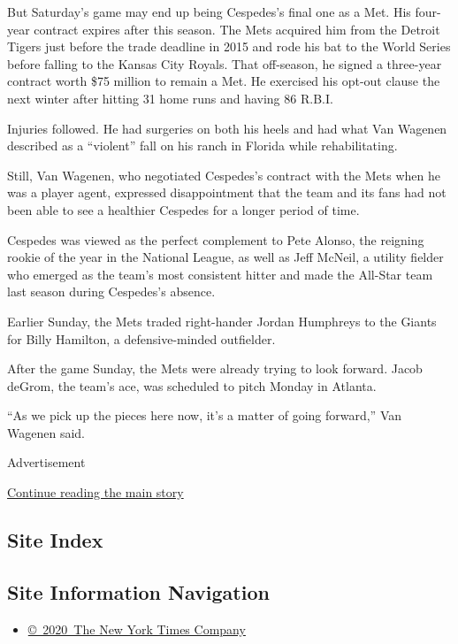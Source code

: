 But Saturday's game may end up being Cespedes's final one as a Met. His
four-year contract expires after this season. The Mets acquired him from
the Detroit Tigers just before the trade deadline in 2015 and rode his
bat to the World Series before falling to the Kansas City Royals. That
off-season, he signed a three-year contract worth \$75 million to remain
a Met. He exercised his opt-out clause the next winter after hitting 31
home runs and having 86 R.B.I.

Injuries followed. He had surgeries on both his heels and had what Van
Wagenen described as a ``violent'' fall on his ranch in Florida while
rehabilitating.

Still, Van Wagenen, who negotiated Cespedes's contract with the Mets
when he was a player agent, expressed disappointment that the team and
its fans had not been able to see a healthier Cespedes for a longer
period of time.

Cespedes was viewed as the perfect complement to Pete Alonso, the
reigning rookie of the year in the National League, as well as Jeff
McNeil, a utility fielder who emerged as the team's most consistent
hitter and made the All-Star team last season during Cespedes's absence.

Earlier Sunday, the Mets traded right-hander Jordan Humphreys to the
Giants for Billy Hamilton, a defensive-minded outfielder.

After the game Sunday, the Mets were already trying to look forward.
Jacob deGrom, the team's ace, was scheduled to pitch Monday in Atlanta.

``As we pick up the pieces here now, it's a matter of going forward,''
Van Wagenen said.

Advertisement

\protect\hyperlink{after-bottom}{Continue reading the main story}

\hypertarget{site-index}{%
\subsection{Site Index}\label{site-index}}

\hypertarget{site-information-navigation}{%
\subsection{Site Information
Navigation}\label{site-information-navigation}}

\begin{itemize}
\tightlist
\item
  \href{https://help.nytimes3xbfgragh.onion/hc/en-us/articles/115014792127-Copyright-notice}{©~2020~The
  New York Times Company}
\end{itemize}

